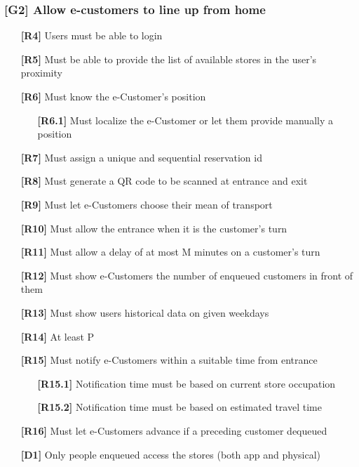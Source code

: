 \subsubsection{[G2] Allow e-customers to line up from home}
\begin{itemize}
	\setlength\itemsep{-1mm}
	\item [\textbf{[R4]}] Users must be able to login
	\item [\textbf{[R5]}] Must be able to provide the list of available stores in the user’s proximity
	\item [\textbf{[R6]}] Must know the e-Customer’s position
	\begin{itemize}[itemsep=-1mm, topsep=-1mm]
		\item [\textbf{[R6.1]}] Must localize the e-Customer or let them provide manually a position
	\end{itemize}
	\item [\textbf{[R7]}] Must assign a unique and sequential reservation id
	\item [\textbf{[R8]}] Must generate a QR code to be scanned at entrance and exit
	\item [\textbf{[R9]}] Must let e-Customers choose their mean of transport
	\item [\textbf{[R10]}] Must allow the entrance when it is the customer’s turn
	\item [\textbf{[R11]}] Must allow a delay of at most M minutes on a customer’s turn
	\item [\textbf{[R12]}] Must show e-Customers the number of enqueued customers in front of them
	\item [\textbf{[R13]}] Must show users historical data on given weekdays
	\item [\textbf{[R14]}] At least P%
	\item [\textbf{[R15]}] Must notify e-Customers within a suitable time from entrance
	\begin{itemize}[itemsep=-1mm, topsep=-1mm]
		\item [\textbf{[R15.1]}] Notification time must be based on current store occupation 
		\item [\textbf{[R15.2]}] Notification time must be based on estimated travel time
	\end{itemize}
	\item [\textbf{[R16]}] Must let e-Customers advance if a preceding customer dequeued
	\\
	\item [\textbf{[D1]}] Only people enqueued access the stores (both app and physical)

\end{itemize}
